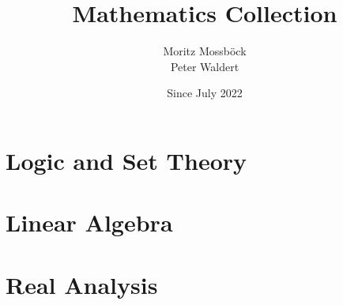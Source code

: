 \documentclass{report}
\author{Moritz Mossböck \\ Peter Waldert}
\title{\textbf{Mathematics Collection}}
\date{Since July 2022}
\begin{document}
    \pagestyle{empty}
    \begin{titlepage}
        \maketitle
    \end{titlepage}

    

    \pagestyle{fancy}
    \tableofcontents

    \newpage
    
    \chapter{Logic and Set Theory}\label{chp:logic_set}
    
    

    \chapter{Linear Algebra}\label{chp:linear_algebra}
    \thispagestyle{empty}
    

    \chapter{Real Analysis}\label{chp:real_analysis}
    \thispagestyle{empty}
    
\end{document}
